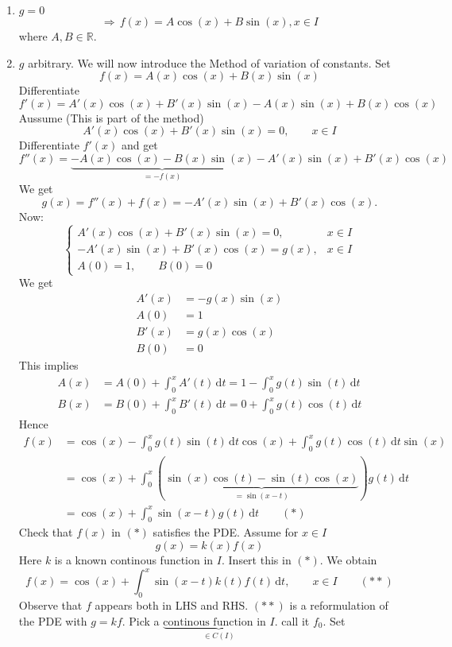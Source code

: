 \begin{enumerate}[1.]
	\item $g=0$
	\[
		\Rightarrow \,f(x) = A \cos(x) + B \sin(x), x \in I
	\]
	where $A,B \in \mathbb{R}$.
	\item $g$ arbitrary. We will now introduce the Method of variation of constants. Set
	\[
		f(x)=A(x) \cos(x)+ B(x) \sin(x)
	\]
	Differentiate
	\[
		f'(x) = A'(x) \cos(x) + B'(x) \sin(x) - A(x) \sin(x) + B(x) \cos(x)
	\]
	Aussume (This is part of the method)
	\[
		A'(x)\cos(x) + B'(x) \sin(x) = 0, \qquad x \in I
	\]
	Differentiate $f'(x)$ and get
	\[
		f''(x)=\underset{= -f(x)}{\underbrace{-A(x) \cos(x) - B(x) \sin(x)}} - A'(x) \sin(x) + B'(x) \cos(x)
	\]
	We get
	\[
		g(x) = f''(x)+f(x) = -A'(x) \sin(x) + B'(x) \cos(x).
	\]
	Now:
	\[
		\begin{cases}
			A'(x)\cos(x) + B'(x) \sin(x) = 0, & x \in I\\
			- A'(x) \sin(x)+ B'(x) \cos(x) = g(x), & x \in I \\
			A(0)=1, \qquad B(0)=0 &
		\end{cases}
	\]
	We get
	\begin{align*}
		A'(x) &= - g(x)\sin(x) \\
		A(0) &= 1 \\
		B'(x) &= g(x) \cos(x) \\
		B(0) &=0
	\end{align*}
	This implies
	\begin{align*}
		A(x) &= A(0) + \int_{0}^{x} A'(t) \,\mathrm{d}t = 1 - \int_{0}^{x} g(t) \sin(t) \,\mathrm{d}t \\
		B(x) &= B(0) + \int_{0}^{x}B'(t) \,\mathrm{d}t = 0 + \int_{0}^{x}g(t)\cos(t) \,\mathrm{d}t
	\end{align*}
	Hence
	\begin{align*}
		f(x) &= \cos(x) - \int_{0}^{x} g(t) \sin(t) \,\mathrm{d}t \cos(x) + \int_{0}^{x} g(t) \cos(t) \,\mathrm{d}t \sin(x) \\
		&= \cos(x) + \int_{0}^{x} (\underset{=\sin(x-t)}{\underbrace{\sin(x)\cos(t)- \sin(t)\cos(x)}})g(t) \,\mathrm{d}t \\
		&= \cos(x) + \int_{0}^{x}\sin(x-t)g(t) \,\mathrm{d}t \qquad (*)
	\end{align*}
	Check that $f(x)$ in $(*)$ satisfies the PDE.
	Assume for $x \in I$
	\[
		g(x) = k(x)f(x)
	\]
	Here $k$ is a known continous function in $I$. Insert this in $(*)$. We obtain
	\[
		f(x) = \cos(x) + \int_{0}^{x} \sin(x-t)k(t)f(t) \,\mathrm{d}t, \qquad x \in I \qquad (**)
	\]
	Observe that $f$ appears both in LHS and RHS. $(**)$ is a reformulation of the PDE with $g=kf$. Pick a $\underset{\in C(I)}{\underbrace{\text{continous function in $I$}}}$. call it $f_0$. Set

\end{enumerate}
